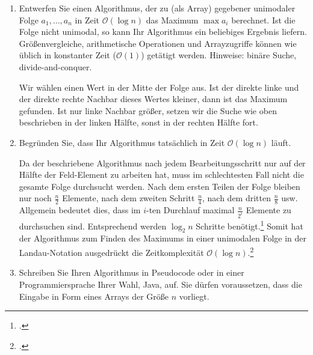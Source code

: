 \documentclass{bschlangaul-aufgabe}
\begin{document}
\begin{enumerate}


\item Entwerfen Sie einen Algorithmus, der zu (als Array) gegebener
unimodaler Folge $a_1, \dots, a_n$ in Zeit $\mathcal{O}(\log n)$ das
Maximum $\max a_i$ berechnet. Ist die Folge nicht unimodal, so kann Ihr
Algorithmus ein beliebiges Ergebnis liefern. Größenvergleiche,
arithmetische Operationen und Arrayzugriffe können wie üblich in
konstanter Zeit ($\mathcal{O}(1)$) getätigt werden. Hinweise: binäre
Suche, divide-and-conquer.

\begin{liAntwort}
Wir wählen einen Wert in der Mitte der Folge aus. Ist der direkte linke
und der direkte rechte Nachbar dieses Wertes kleiner, dann ist das
Maximum gefunden. Ist nur linke Nachbar größer, setzen wir die Suche wie
oben beschrieben in der linken Hälfte, sonst in der rechten Hälfte fort.
\end{liAntwort}


\item Begründen Sie, dass Ihr Algorithmus tatsächlich in Zeit
$\mathcal{O}(\log n)$ läuft.

\begin{liAntwort}
Da der beschriebene Algorithmus nach jedem Bearbeitungsschritt nur auf
der Hälfte der Feld-Element zu arbeiten hat, muss im schlechtesten Fall
nicht die gesamte Folge durchsucht werden. Nach dem ersten Teilen der
Folge bleiben nur noch $\frac{n}{2}$ Elemente, nach dem zweiten Schritt
$\frac{n}{4}$, nach dem dritten $\frac{n}{8}$ usw. Allgemein bedeutet
dies, dass im $i$-ten Durchlauf maximal $\frac{n}{2^i}$ Elemente zu
durchsuchen sind. Entsprechend werden $\log_2 n$ Schritte
benötigt.\footcite[Seite 122]{saake} Somit hat der Algorithmus zum
Finden des Maximums in einer unimodalen Folge in der Landau-Notation
ausgedrückt die Zeitkomplexität $\mathcal{O}(\log
n)$.\footcite{wiki:binaere-suche}
\end{liAntwort}


\item Schreiben Sie Ihren Algorithmus in Pseudocode oder in einer
Programmiersprache Ihrer Wahl, \zB Java, auf. Sie dürfen voraussetzen,
dass die Eingabe in Form eines Arrays der Größe $n$ vorliegt.

\begin{liAntwort}


\end{liAntwort}
\end{enumerate}
\end{document}
